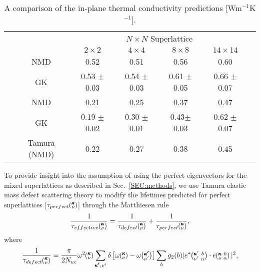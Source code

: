 \documentclass[aps,prb,preprint,preprintnumbers,amsmath,amssymb,floatfix,superscriptaddress]{revtex4}
\newcommand{\kvba}{\mspace{-4.0mu}\left(\mspace{-8.0mu}
\begin{smallmatrix} &\pmb{\kappa} &b \\ &\nu &\alpha\end{smallmatrix}
\mspace{-3.0mu}\right)}
\newcommand{\kvbap}{\mspace{-4.0mu}\left(\mspace{-8.0mu}
\begin{smallmatrix} &\pmb{\kappa}' &b \\ &\nu' &\alpha\end{smallmatrix}
\mspace{-3.0mu}\right)}
\newcommand{\kv}{\mspace{-4.0mu}\left(\mspace{-8.0mu}
\begin{smallmatrix}&\pmb{\kappa} \\&\nu\end{smallmatrix}
\mspace{-3.0mu}\right)}
\newcommand{\kvp}{\mspace{-4.0mu}\left(\mspace{-8.0mu}
\begin{smallmatrix}&\pmb{\kappa'} \\&\nu'\end{smallmatrix}
\mspace{-3.0mu}\right)}
\begin{document}
\begin{table}
\begin{center}
\begin{tabular*}{\textwidth}{c@{\extracolsep{\fill}}cccccc}
\hline\hline\noalign{\smallskip}
&&\multicolumn{4}{c}{$N\times N$ Superlattice} \\
\cline{3-6}\noalign{\smallskip}
\hspace{1cm} && $2\times2$ & $4\times4$ & $8\times8$ & $14\times14$  \\
\noalign{\smallskip}\hline\noalign{\smallskip}
\multirow{2}{*}{Perfect} &NMD &0.52 & 0.51 & 0.56 & 0.60\\
&GK &0.53 $\pm$ 0.03 &  0.54 $\pm$ 0.03 &  0.61 $\pm$ 0.05  &  0.66 $\pm$ 0.07 \\
\noalign{\smallskip}\hline
\multirow{3}{*}{Mixed} & NMD &0.21 & 0.25 &	0.37 & 0.47\\
&GK & 0.19 $\pm$ 0.02 &  0.30 $\pm$ 0.01  & 0.43$\pm$ 0.03 &  0.62 $\pm$ 0.07 \\   
&Tamura (NMD)& 0.22 & 0.27 & 0.38 &0.45\\
\hline\hline
\end{tabular*}
\end{center}
\renewcommand{\table}{Table.}
\caption{A comparison of the in-plane thermal conductivity predictions [Wm$^{-1}$K$^{-1}$].}
\label{TB:K_IP}
\end{table}
To provide insight into the assumption of using the perfect eigenvectors for the mixed superlattices as described in Sec.~\ref{SEC:methods}, we use Tamura elastic mass defect scattering theory \cite{tamura_isotope_1983} to modify the lifetimes predicted for perfect superlattices [$\tau_{perfect}\kv$] through the Matthiesen rule %
\begin{equation}\label{EQ:tau_eff}
\begin{split}
\frac{1}{\tau_{effective}\kv} = \frac{1}{\tau_{defect}\kv}+\frac{1}{\tau_{perfect}\kv} ,
\end{split}
\end{equation}
where
\begin{equation}\label{EQ:tau_d}
\begin{split}
\frac{1}{\tau_{defect}\kv} = \frac{\pi}{2N_{uc}}\omega^2\kv 
\sum_{\pmb{\kappa'},\nu'} \delta\left[ \omega\kv - \omega\kvp \right]\sum_{b} g_2(b) 
|e^*\kvbap \cdot e\kvba |^2 ,
\end{split}
\end{equation}
\end{document}
